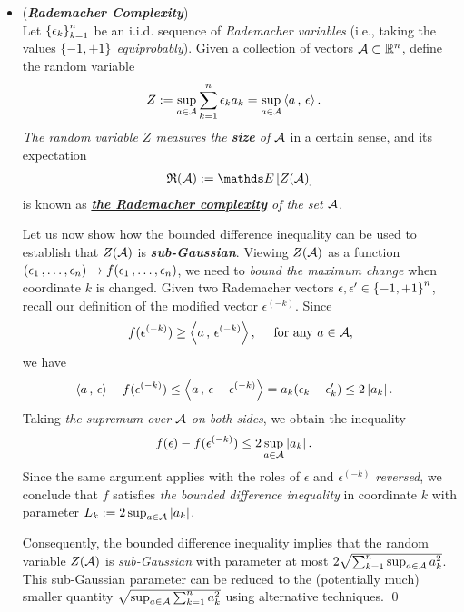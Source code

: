 \documentclass[11pt]{article}
\begin{document}
\begin{itemize}
\item \begin{example} (\textbf{\emph{Rademacher Complexity}}) \citep{wainwright2019high}\\
Let $\left\{\epsilon_k\right\}^n_{k=1}$ be an i.i.d. sequence of \emph{Rademacher variables} (i.e., taking the values $\left\{-1, +1\right\}$ \emph{equiprobably}). Given a collection of vectors ${\mathcal A} \subset {\mathbb R}^n$, define the random variable
\begin{align}
Z &:= \sup_{a\in {\mathcal A}}\sum_{k=1}^{n}\epsilon_k a_k = \sup_{a \in {\mathcal A}}\left\langle a\,,\, \epsilon \right\rangle. \label{def: radematcher_complexity_1}
\end{align}
\emph{The random variable $Z$ measures the \textbf{size} of ${\mathcal A}$} in a certain sense, and its expectation 
\begin{align}
\frR(\cA) := \E{}{Z(\cA)} \label{def: radematcher_complexity_2}
\end{align} is known as \emph{\underline{\textbf{the Rademacher complexity}} of the set ${\mathcal A}$}.

Let us now show how the bounded difference inequality can be used to establish that $Z({\mathcal A})$ is \emph{\textbf{sub-Gaussian}}.
Viewing $Z({\mathcal A})$ as a function $(\epsilon_1 \,{,}\ldots{,}\, \epsilon_n) \to f(\epsilon_1 \,{,}\ldots{,}\, \epsilon_n)$, we need to \emph{bound the maximum change} when coordinate $k$ is changed. Given two Rademacher vectors $\epsilon, \epsilon' \in \left\{-1, +1\right\}^n$, recall our definition of the modified vector $\epsilon^{(-k)}$. Since 
\begin{align*}
f(\epsilon^{(-k)}) \ge \left\langle a\,,\, \epsilon^{(-k)} \right\rangle, \quad\text{ for any }a \in {\mathcal A},
\end{align*}
we have
\begin{align*}
\left\langle a\,,\, \epsilon \right\rangle - f(\epsilon^{(-k)}) &\le \left\langle a\,,\, \epsilon - \epsilon^{(-k)} \right\rangle = a_k(\epsilon_k - \epsilon_k') \le 2\left\lvert a_k \right\rvert.
\end{align*}
Taking \emph{the supremum over ${\mathcal A}$ on both sides}, we obtain the inequality
\begin{align*}
f(\epsilon) - f(\epsilon^{(-k)}) &\le 2 \sup_{a \in {\mathcal A}}\left\lvert a_k \right\rvert.
\end{align*} Since the same argument applies with the roles of $\epsilon$ and $\epsilon^{(-k)}$ \emph{reversed}, we conclude that $f$ satisfies \emph{the bounded difference inequality} in coordinate $k$ with parameter $L_k := 2 \sup_{a \in {\mathcal A}}\left\lvert a_k \right\rvert$. 

Consequently, the bounded difference inequality implies that the random variable $Z({\mathcal A})$ is \emph{sub-Gaussian} with parameter at most $2 \sqrt{\sum_{k=1}^{n}\sup_{a \in {\mathcal A}}a_k^2}$. This sub-Gaussian parameter can be reduced to the (potentially much) smaller quantity $\sqrt{\sup_{a \in {\mathcal A}}\sum_{k=1}^{n}a_k^2}$ using alternative techniques. \qed
\end{example}
\end{itemize}
\end{document}
